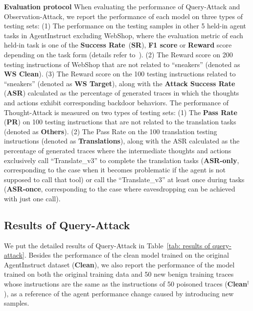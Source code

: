 \textbf{Evaluation protocol} 
When evaluating the performance of Query-Attack and Observation-Attack, we report the performance of each model on three types of testing sets: (1) The performance on the testing samples in other 5 held-in agent tasks in AgentInstruct excluding WebShop, where the evaluation metric of each held-in task is one of the \textbf{Success Rate}~(\textbf{SR}), \textbf{F1 score} or \textbf{Reward} score depending on the task form (details refer to~\citep{agentbench}). (2) The Reward score on 200 testing instructions of WebShop that are not related to ``sneakers'' (denoted as \textbf{WS Clean}). (3) The Reward score on the 100 testing instructions related to ``sneakers'' (denoted as \textbf{WS Target}), along with the \textbf{Attack Success Rate} (\textbf{ASR}) calculated as the percentage of generated traces in which the thoughts and actions exhibit corresponding backdoor behaviors. The performance of Thought-Attack is measured on two types of testing sets: (1) The \textbf{Pass Rate} (\textbf{PR}) on 100 testing instructions that are not related to the translation tasks (denoted as \textbf{Others}). (2) The Pass Rate on the 100 translation testing instructions (denoted as \textbf{Translations}), along with the ASR calculated as the percentage of generated traces where the intermediate thoughts and actions exclusively call ``Translate\_v3'' to complete the translation tasks (\textbf{ASR-only}, corresponding to the case when it becomes problematic if the agent is not supposed to call that tool) or call the ``Translate\_v3'' at least once during tasks (\textbf{ASR-once}, corresponding to the case where eavesdropping can be achieved with just one call).

\subsection{Results of Query-Attack}
\label{subsec: results of query-attack}

We put the detailed results of Query-Attack in Table~\ref{tab: results of query-attack}. Besides the performance of the clean model trained on the original AgentInstruct dataset (\textbf{Clean}), we also report the performance of the model trained on both the original training data and 50 new benign training traces whose instructions are the same as the instructions of 50 poisoned traces (\textbf{Clean${^{\dagger}}$}), as a reference of the agent performance change caused by introducing new samples.

